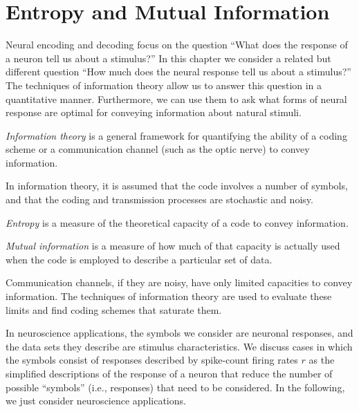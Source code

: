 \section{Entropy and Mutual Information}
\label{sec:Entropy and Mutual Information}
\begin{rem}
  Neural encoding and decoding focus on the question ``What does the response
of a neuron tell us about a stimulus?'' In this chapter we consider
a related but different question ``How much does the neural response tell
us about a stimulus?'' The techniques of information theory allow us to
answer this question in a quantitative manner. Furthermore, we can use
them to ask what forms of neural response are optimal for conveying information
about natural stimuli.
\end{rem}

\begin{defn}
   \emph{Information theory} is a general framework for quantifying the ability of a coding scheme or a communication channel (such as the optic nerve) to convey information.
\end{defn}

\begin{asm}
In information theory, it is assumed that the code involves a number of symbols, and that the coding and transmission processes are stochastic and noisy.
\end{asm}

\begin{defn}
  \label{def:entropy}
  \emph{Entropy} is a measure of the theoretical capacity of a code to convey information.
\end{defn}

\begin{defn}
  \label{def:mutualInformation}
  \emph{Mutual information} is a measure of how much of that capacity is actually used when the code is employed to describe a particular set of data.
\end{defn}

\begin{rem}
  Communication channels, if they are noisy, have only limited capacities to convey information. The techniques of information theory are used to evaluate these limits and find coding schemes that saturate them.
\end{rem}

\begin{ntn}
  In neuroscience applications, the symbols we consider are neuronal responses, and the data sets they describe are stimulus characteristics. We discuss cases in which the symbols consist of responses described by spike-count firing rates $r$ as the simplified descriptions of the response of a neuron that reduce the number of possible ``symbols'' (i.e., responses) that need to be considered. %
  In the following, we just consider neuroscience applications.
\end{ntn}

